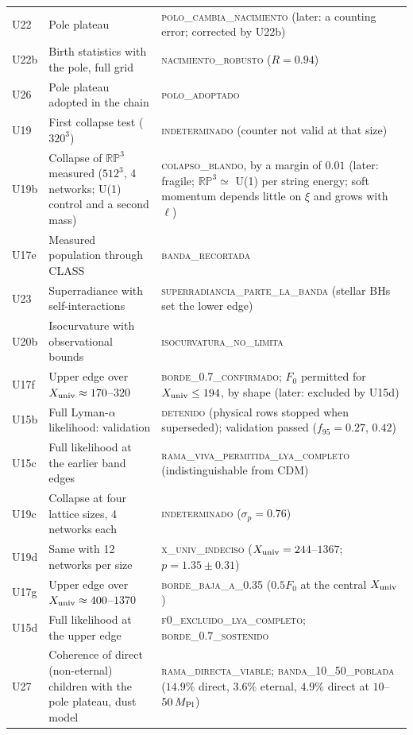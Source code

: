 \documentclass[11pt,a4paper]{article}
\newcommand{\RP}{\mathbb{RP}^3}
\newcommand{\Mpl}{M_{\rm Pl}}
\newcommand{\Xu}{X_{\rm univ}}
\begin{document}
\begin{small}
\begin{longtable}{L{1.3cm}L{6.0cm}L{7.0cm}}
U22 & Pole plateau & \textsc{polo\_cambia\_nacimiento} (later: a counting error; corrected by U22b) \\
U22b & Birth statistics with the pole, full grid & \textsc{nacimiento\_robusto} ($R=0.94$) \\
U26 & Pole plateau adopted in the chain & \textsc{polo\_adoptado} \\
U19 & First collapse test ($320^3$) & \textsc{indeterminado} (counter not valid at that size) \\
U19b & Collapse of $\RP$ measured ($512^3$, 4 networks; U(1) control and a second mass) & \textsc{colapso\_blando}, by a margin of $0.01$ (later: fragile; $\RP\simeq$ U(1) per string energy; soft momentum depends little on $\xi$ and grows with $\ell$) \\
U17e & Measured population through CLASS & \textsc{banda\_recortada} \\
U23 & Superradiance with self-interactions & \textsc{superradiancia\_parte\_la\_banda} (stellar BHs set the lower edge) \\
U20b & Isocurvature with observational bounds & \textsc{isocurvatura\_no\_limita} \\
U17f & Upper edge over $\Xu\approx170$--$320$ & \textsc{borde\_0.7\_confirmado}; $F_0$ permitted for $\Xu\le194$, by shape (later: excluded by U15d) \\
U15b & Full Lyman-$\alpha$ likelihood: validation & \textsc{detenido} (physical rows stopped when superseded); validation passed ($f_{95}=0.27$, $0.42$) \\
U15c & Full likelihood at the earlier band edges & \textsc{rama\_viva\_permitida\_lya\_completo} (indistinguishable from CDM) \\
U19c & Collapse at four lattice sizes, 4 networks each & \textsc{indeterminado} ($\sigma_p=0.76$) \\
U19d & Same with 12 networks per size & \textsc{x\_univ\_indeciso} ($\Xu=244$--$1367$; $p=1.35\pm0.31$) \\
U17g & Upper edge over $\Xu\approx400$--$1370$ & \textsc{borde\_baja\_a\_0.35} ($0.5F_0$ at the central $\Xu$) \\
U15d & Full likelihood at the upper edge & \textsc{f0\_excluido\_lya\_completo}; \textsc{borde\_0.7\_sostenido} \\
U27 & Coherence of direct (non-eternal) children with the pole plateau, dust model & \textsc{rama\_directa\_viable}; \textsc{banda\_10\_50\_poblada} ($14.9\%$ direct, $3.6\%$ eternal, $4.9\%$ direct at $10$--$50\,\Mpl$) \\

\end{longtable}
\end{small}
\end{document}
